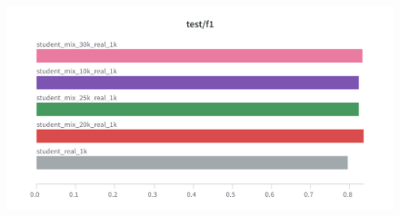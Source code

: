 \documentclass[11pt]{article}
\begin{document}
\begin{figure}[htbp]
  \centering
  \includegraphics[width=\linewidth]{figures/student_size/student_f1.png}
  \endminipage


\end{figure}
\end{document}
